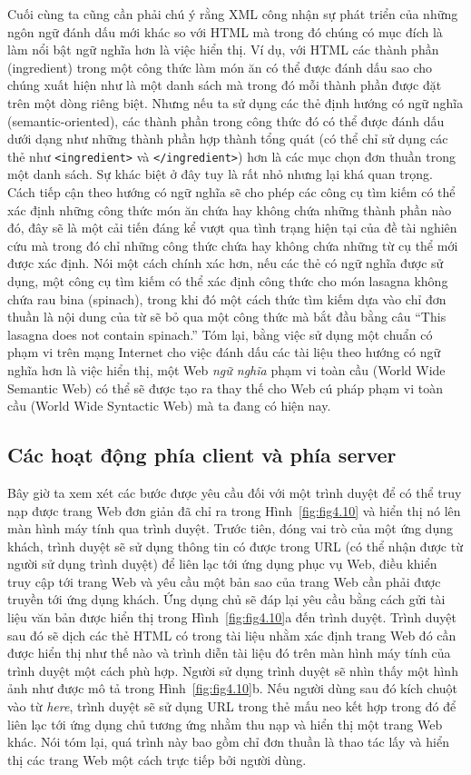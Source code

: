 Cuối cùng ta cũng cần phải chú ý rằng XML công nhận sự phát triển của những ngôn ngữ
đánh dấu mới khác so với HTML mà trong đó chúng có mục đích là làm nổi bật ngữ nghĩa hơn
là việc hiển thị. Ví dụ, với HTML các thành phần (ingredient) trong một công thức làm món
ăn có thể được đánh dấu sao cho chúng xuất hiện như là một danh sách mà trong đó mỗi thành
phần được đặt trên một dòng riêng biệt. Nhưng nếu ta sử dụng các thẻ định hướng có
ngữ nghĩa (semantic-oriented), các thành phần trong công thức đó có thể được đánh dấu dưới
dạng như những thành phần hợp thành tổng quát (có thể chỉ sử dụng các thẻ như
\texttt{<ingredient>} và \texttt{</ingredient>}) hơn là các mục chọn đơn thuần trong một
danh sách. Sự khác biệt ở đây tuy là rất nhỏ nhưng lại khá quan trọng. Cách tiếp cận theo
hướng có ngữ nghĩa sẽ cho phép các công cụ tìm kiếm có thể xác định những công thức món ăn
chứa hay không chứa những thành phần nào đó, đây sẽ là một cải tiến đáng kể vượt qua tình
trạng hiện tại của đề tài nghiên cứu mà trong đó chỉ những công thức chứa hay không chứa
những từ cụ thể mới được xác định. Nói một cách chính xác hơn, nếu các thẻ có ngữ nghĩa
được sử dụng, một công cụ tìm kiếm có thể xác định công thức cho món lasagna không chứa
rau bina (spinach), trong khi đó một cách thức tìm kiếm dựa vào chỉ đơn thuần là nội dung
của từ sẽ bỏ qua một công thức mà bắt đầu bằng câu ``This lasagna does not contain
spinach.'' Tóm lại, bằng việc sử dụng một chuẩn có phạm vi trên mạng Internet cho việc
đánh dấu các tài liệu theo hướng có ngữ nghĩa hơn là việc hiển thị, một Web \textit{ngữ
  nghĩa} phạm vi toàn cầu (World Wide Semantic Web) có thể sẽ được tạo ra thay thế cho Web
cú pháp phạm vi toàn cầu (World Wide Syntactic Web) mà ta đang có hiện nay.

\subsection*{Các hoạt động phía client và phía server}

Bây giờ ta xem xét các bước được yêu cầu đối với một trình duyệt để có thể truy nạp
được trang Web đơn giản đã chỉ ra trong Hình~\ref{fig:fig4.10} và hiển thị nó lên màn hình
máy tính qua trình duyệt. Trước tiên, đóng vai trò của một ứng dụng khách, trình duyệt sẽ
sử dụng thông tin có được trong URL (có thể nhận được từ người sử dụng trình duyệt) để
liên lạc tới ứng dụng phục vụ Web, điều khiển truy cập tới trang Web và yêu cầu một bản
sao của trang Web cần phải được truyền tới ứng dụng khách. Ứng dụng chủ sẽ đáp lại yêu cầu
bằng cách gửi tài liệu văn bản được hiển thị trong Hình~\ref{fig:fig4.10}a đến trình
duyệt. Trình duyệt sau đó sẽ dịch các thẻ HTML có trong tài liệu nhằm xác định trang Web
đó cần được hiển thị như thế nào và trình diễn tài liệu đó trên màn hình máy tính của
trình duyệt một cách phù hợp. Người sử dụng trình duyệt sẽ nhìn thấy một hình ảnh như được
mô tả trong Hình~\ref{fig:fig4.10}b. Nếu người dùng sau đó kích chuột vào từ
\textit{here}, trình duyệt sẽ sử dụng URL trong thẻ mấu neo kết hợp trong đó để liên lạc
tới ứng dụng chủ tương ứng nhằm thu nạp và hiển thị một trang Web khác. Nói tóm lại, quá
trình này bao gồm chỉ đơn thuần là thao tác lấy và hiển thị các trang Web một cách trực
tiếp bởi người dùng.

